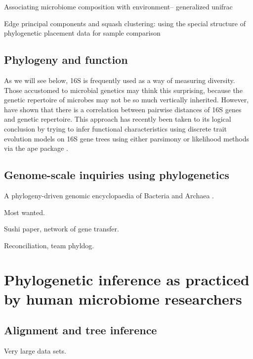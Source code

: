 \documentclass{amsart}
\begin{document}
\cite{BikEaMicrobiotaStomach06}
\cite{PurdomAnalyzingDataGraphs08}

\cite{chen2012associating}
Associating microbiome composition with environment-- generalized unifrac

\cite{matsen2013edge}
Edge principal components and squash clustering: using the special structure of phylogenetic placement data for sample comparison



\subsection{Phylogeny and function}

As we will see below, 16S is frequently used as a way of measuring diversity.
Those accustomed to microbial genetics may think this surprising, because the genetic repertoire of microbes may not be so much vertically inherited.
However, \citep{zaneveld2010ribosomal} have shown that there is a correlation between pairwise distances of 16S genes and genetic repertoire.
This approach has recently been taken to its logical conclusion by trying to infer functional characteristics using discrete trait evolution models on 16S gene trees \citep{langille2013predictive} using either parsimony \citep{kluge1969quantitative} or likelihood \citep{pagel1994detecting} methods via the ape package \citep{paradis2004ape}.


\subsection{Genome-scale inquiries using phylogenetics}

A phylogeny-driven genomic encyclopaedia of Bacteria and Archaea \cite{wu2009phylogeny}.

Most wanted.

Sushi paper, network of gene transfer.

Reconciliation, team phyldog.


\section{Phylogenetic inference as practiced by human microbiome researchers}

\subsection{Alignment and tree inference}

Very large data sets.
\end{document}
